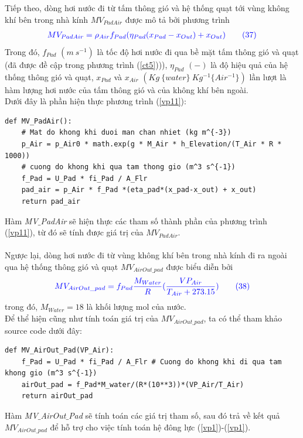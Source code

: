 \documentclass[13pt,a4paper]{article}
\begin{document}
			Tiếp theo, dòng hơi nước đi từ tấm thông gió và hệ thống quạt tới vùng không khí bên trong nhà kính $MV_{PadAir}$  được mô tả bởi phương trình
			\begin{align}
				\color{blue}
					MV_{PadAir} = \rho_{Air}f_{Pad}(\eta_{Pad}(x_{Pad} - x_{Out}) + x_{Out})
				\color{blue}
				\tag{37}\label{vp11}
			\end{align}
			Trong đó, $f_{Pad}$ $(m\ s^{-1})$ là tốc độ hơi nước đi qua bề mặt tấm thông gió và quạt (đã được đề cập trong phương trình (\ref{ct5}))), $\eta_{Pad}$ $(-)$ là độ hiệu quả của hệ thống thông gió và quạt, $x_{Pad}$ và $x_{Air}$ $(Kg\ \{water\}\ Kg^{-1} \{Air^{-1}\})$ lần lượt là hàm lượng hơi nước của tấm thông gió và của không khí bên ngoài.  \\
			Dưới đây là phần hiện thực phương trình (\ref{vp11}):
\begin{lstlisting}
def MV_PadAir():
	# Mat do khong khi duoi man chan nhiet (kg m^{-3})
	p_Air = p_Air0 * math.exp(g * M_Air * h_Elevation/(T_Air * R * 1000))  
	# cuong do khong khi qua tam thong gio (m^3 s^{-1})
	f_Pad = U_Pad * fi_Pad / A_Flr  
	pad_air = p_Air * f_Pad *(eta_pad*(x_pad-x_out) + x_out)
	return pad_air
\end{lstlisting}
			Hàm \textit{MV$\_$PadAir} sẽ hiện thực các tham số thành phần của phương trình (\ref{vp11}), từ đó sẽ tính được giá trị của $MV_{PadAir}$. \\ \\
			
			Ngược lại, dòng hơi nước đi từ vùng không khí bên trong nhà kính đi ra ngoài qua hệ thống thông gió và quạt $MV_{AirOut\_pad}$ được biểu diễn bởi
			\begin{align}
				\color{blue}
					MV_{AirOut\_pad} = f_{Pad}\frac{M_{Water}}{R}(\dfrac{VP_{Air}}{T_{Air} + 273.15})
				\color{blue}
				\tag{38}\label{vp12}
			\end{align}
			trong đó, $M_{Water} = 18$ là khối lượng mol của nước.\\
			Để thể hiện cũng như tính toán giá trị của $MV_{AirOut\_pad}$, ta có thể tham khảo source code dưới đây:
\begin{lstlisting}
def MV_AirOut_Pad(VP_Air):
	f_Pad = U_Pad * fi_Pad / A_Flr # Cuong do khong khi di qua tam khong gio (m^3 s^{-1})
	airOut_pad = f_Pad*M_water/(R*(10**3))*(VP_Air/T_Air)
	return airOut_pad
\end{lstlisting}
			Hàm \textit{MV$\_$AirOut$\_$Pad} sẽ tính toán các giá trị tham số, sau đó trả về kết quả $MV_{AirOut\_pad}$ để hỗ trợ cho việc tính toán hệ đông lực (\ref{vp1})-(\ref{vp1}). \\ \\
\end{document}
